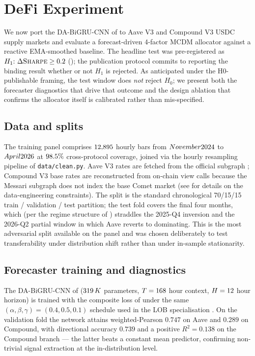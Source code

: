 \section{DeFi Experiment}
\label{sec:defi-experiment}

We now port the DA-BiGRU-CNN of
 to Aave V3 and
Compound V3 USDC supply markets and evaluate a forecast-driven 4-factor
MCDM allocator against a reactive EMA-smoothed baseline.  The headline
test was pre-registered as $H_1{:}~\Delta\textsc{Sharpe}\ge 0.2$
(); the publication protocol commits to reporting
the binding result whether or not $H_1$ is rejected.  As anticipated
under the H0-publishable framing, the test window does \emph{not} reject
$H_0$; we present both the forecaster diagnostics that drive that
outcome and the design ablation that confirms the allocator itself is
calibrated rather than mis-specified.

\subsection{Data and splits}
\label{sec:defi-data}

The training panel comprises $12{,}895$ hourly bars from $November 2024$
to $April 2026$ at $98.5\%$ cross-protocol coverage, joined via the
hourly resampling pipeline of \texttt{data/clean.py}.  Aave V3 rates are
fetched from the official subgraph
\cite{aavecompoundcrosschain2025,gudgeon2020loanable}; Compound V3 base
rates are reconstructed from on-chain view calls because the Messari
subgraph does not index the base Comet market
(see  for details on the data-engineering
constraints).  The split is the standard chronological 70/15/15 train /
validation / test partition; the test fold covers the final four months,
which (per the regime structure of )
straddles the 2025-Q4 inversion and the 2026-Q2 partial window in which
Aave reverts to dominating.  This is the most adversarial split available
on the panel and was chosen deliberately to test transferability under
distribution shift rather than under in-sample stationarity.

\subsection{Forecaster training and diagnostics}
\label{sec:defi-forecaster}

The DA-BiGRU-CNN of  ($319\,K$
parameters, $T=168$ hour context, $H=12$ hour horizon) is
trained with the composite loss of  under the
same $(\alpha,\beta,\gamma)=(0.4,0.5,0.1)$ schedule used in the LOB
specialisation \cite{solovev2026lob}.  On the validation fold the
network attains weighted-Pearson $0.747$ on Aave and $0.289$ on
Compound, with directional accuracy $0.739$ and a positive
$R^{2}=0.138$ on the Compound branch --- the latter beats a constant
mean predictor, confirming non-trivial signal extraction at the
in-distribution level.

